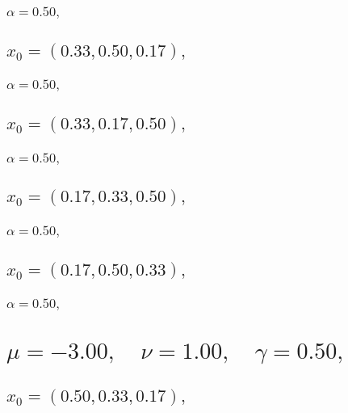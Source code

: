 \documentclass[a4paper]{article}
\begin{document}
\begin{multicols*}{2}
   \subsubsection{\(\alpha = 0.50,\quad \)}
   

   \subsection{\(x_0 = (0.33,0.50,0.17),\quad \)}
   

   \subsubsection{\(\alpha = 0.50,\quad \)}
   

   \subsection{\(x_0 = (0.33,0.17,0.50),\quad \)}
   

   \subsubsection{\(\alpha = 0.50,\quad \)}
   

   \subsection{\(x_0 = (0.17,0.33,0.50),\quad \)}
   

   \subsubsection{\(\alpha = 0.50,\quad \)}
   

   \subsection{\(x_0 = (0.17,0.50,0.33),\quad \)}
   

   \subsubsection{\(\alpha = 0.50,\quad \)}
   

   \section{\(\mu = -3.00,\quad \nu = 1.00,\quad \gamma = 0.50,\quad \)}
   

   \subsection{\(x_0 = (0.50,0.33,0.17),\quad \)}
   


\end{multicols*}
\end{document}
